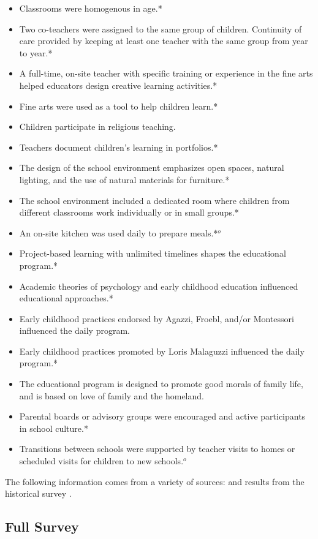 \begin{itemize}
\begin{itemize}
 	\item Classrooms were homogenous in age.*
 	\item Two co-teachers were assigned to the same group of children. Continuity of care provided by keeping at least one teacher with the same group from year to year.*
 	\item A full-time, on-site teacher with specific training or experience in the fine arts helped educators design creative learning activities.*
 	\item Fine arts were used as a tool to help children learn.*
 	\item Children participate in religious teaching.
 	\item Teachers document children's learning in portfolios.*
 	\item The design of the school environment emphasizes open spaces, natural lighting, and the use of natural materials for furniture.*
 	\item The school environment included a dedicated room where children from different classrooms work individually or in small groups.*
 	\item An on-site kitchen was used daily to prepare meals.*$^o$
 	\item Project-based learning with unlimited timelines shapes the educational program.*
 	\item Academic theories of psychology and early childhood education influenced educational approaches.*
 	\item Early childhood practices endorsed by Agazzi, Froebl, and/or Montessori influenced the daily program.
 	\item Early childhood practices promoted by Loris Malaguzzi influenced the daily program.*
 	\item The educational program is designed to promote good morals of family life, and is based on love of family and the homeland.
 	\item Parental boards or advisory groups were encouraged and active participants in school culture.*
	\item Transitions between schools were supported by teacher visits to homes or scheduled visits for children to new schools.$^o$
 \end{itemize}
 \end{itemize}
 
The following information comes from a variety of sources: \citet{Reggio-Admin-data_1966-2006, Reggio-Annual-Journals_1994-2011, Padova-Admin-Data_1964-2011} and results from the historical survey \citep{CEHD_2016_Historical-Analysis}.
 
\subsection{Full Survey}


